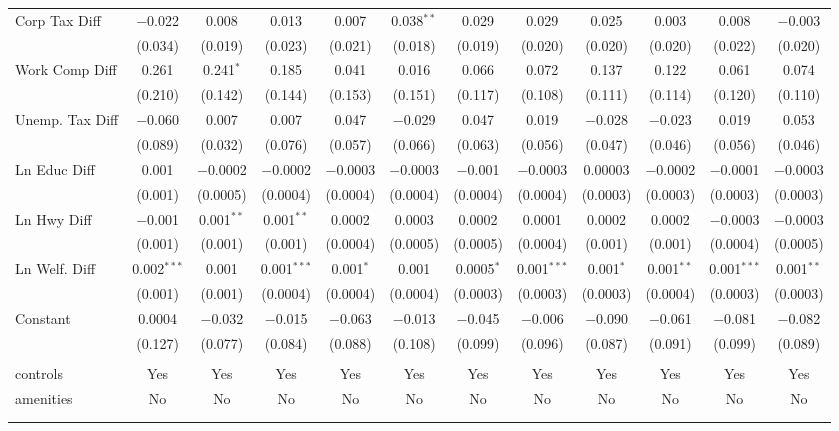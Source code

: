 \begin{table}[!htbp]
\begin{tabular}{@{\extracolsep{5pt}}lccccccccccc}
  Corp Tax Diff & $-$0.022 & 0.008 & 0.013 & 0.007 & 0.038$^{**}$ & 0.029 & 0.029 & 0.025 & 0.003 & 0.008 & $-$0.003 \\ 
  & (0.034) & (0.019) & (0.023) & (0.021) & (0.018) & (0.019) & (0.020) & (0.020) & (0.020) & (0.022) & (0.020) \\ 
  Work Comp Diff & 0.261 & 0.241$^{*}$ & 0.185 & 0.041 & 0.016 & 0.066 & 0.072 & 0.137 & 0.122 & 0.061 & 0.074 \\ 
  & (0.210) & (0.142) & (0.144) & (0.153) & (0.151) & (0.117) & (0.108) & (0.111) & (0.114) & (0.120) & (0.110) \\ 
  Unemp. Tax Diff & $-$0.060 & 0.007 & 0.007 & 0.047 & $-$0.029 & 0.047 & 0.019 & $-$0.028 & $-$0.023 & 0.019 & 0.053 \\ 
  & (0.089) & (0.032) & (0.076) & (0.057) & (0.066) & (0.063) & (0.056) & (0.047) & (0.046) & (0.056) & (0.046) \\ 
  Ln Educ Diff & 0.001 & $-$0.0002 & $-$0.0002 & $-$0.0003 & $-$0.0003 & $-$0.001 & $-$0.0003 & 0.00003 & $-$0.0002 & $-$0.0001 & $-$0.0003 \\ 
  & (0.001) & (0.0005) & (0.0004) & (0.0004) & (0.0004) & (0.0004) & (0.0004) & (0.0003) & (0.0003) & (0.0003) & (0.0003) \\ 
  Ln Hwy Diff & $-$0.001 & 0.001$^{**}$ & 0.001$^{**}$ & 0.0002 & 0.0003 & 0.0002 & 0.0001 & 0.0002 & 0.0002 & $-$0.0003 & $-$0.0003 \\ 
  & (0.001) & (0.001) & (0.001) & (0.0004) & (0.0005) & (0.0005) & (0.0004) & (0.001) & (0.001) & (0.0004) & (0.0005) \\ 
  Ln Welf. Diff & 0.002$^{***}$ & 0.001 & 0.001$^{***}$ & 0.001$^{*}$ & 0.001 & 0.0005$^{*}$ & 0.001$^{***}$ & 0.001$^{*}$ & 0.001$^{**}$ & 0.001$^{***}$ & 0.001$^{**}$ \\ 
  & (0.001) & (0.001) & (0.0004) & (0.0004) & (0.0004) & (0.0003) & (0.0003) & (0.0003) & (0.0004) & (0.0003) & (0.0003) \\ 
  Constant & 0.0004 & $-$0.032 & $-$0.015 & $-$0.063 & $-$0.013 & $-$0.045 & $-$0.006 & $-$0.090 & $-$0.061 & $-$0.081 & $-$0.082 \\ 
  & (0.127) & (0.077) & (0.084) & (0.088) & (0.108) & (0.099) & (0.096) & (0.087) & (0.091) & (0.099) & (0.089) \\ 
 \hline \\[-1.8ex] 
controls & Yes & Yes & Yes & Yes & Yes & Yes & Yes & Yes & Yes & Yes & Yes \\ 
amenities & No & No & No & No & No & No & No & No & No & No & No \\ 
\hline \\[-1.8ex] 
\hline 
\hline \\[-1.8ex] 
\end{tabular} 
\end{table} 
